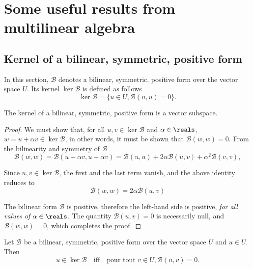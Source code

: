 \appendix

\section{Some useful results from multilinear algebra}

\subsection{Kernel of a bilinear, symmetric, positive form}

In this section, $\mathcal{B}$ denotes a bilinear, symmetric, positive form over the vector space $U$. Its kernel
$\ker \mathcal{B}$ is defined as follows
\begin{equation}
 \ker \mathcal{B}= \bigl\{ u \in U, \mathcal{B}(u, u) = 0 \bigr\} .
\end{equation}

\begin{theorem}
  The kernel of a bilinear, symmetric, positive form is a vector subspace.
\end{theorem}
\begin{proof}
  We must show that, for all $u, v \in\ker \mathcal{B}$ and $\alpha \in \reals$,
  $w = u + \alpha v \in \ker \mathcal{B}$, in other words, it must be shown that $\mathcal{B}(w, w) = 0$. From the
  bilinearity and symmetry of $\mathcal{B}$
 \begin{equation*}
   \mathcal{B}(w, w) = \mathcal{B}(u + \alpha v, u + \alpha v)
   = \mathcal{B}(u, u) + 2 \alpha \mathcal{B}(u, v) + \alpha^2 \mathcal{B}(v, v),
 \end{equation*}

 Since $u, v \in \ker\mathcal{B}$, the first and the last term vanish, and the above identity reduces to
 \begin{equation*}
   \mathcal{B}(w, w) = 2\alpha \mathcal{B}(u, v)
 \end{equation*}

 The bilinear form $\mathcal{B}$ is positive, therefore the left-hand side is positive, \emph{for all values of
   $\alpha \in \reals$}. The quantity $\mathcal{B}(u, v) = 0$ is necessarily null, and $\mathcal{B}(w, w) = 0$, which
 completes the proof.
\end{proof}

\begin{theorem}
  Let $\mathcal{B}$ be a bilinear, symmetric, positive form over the vector space $U$ and $u \in U$. Then
 \begin{equation*}
  u \in \ker\mathcal{B} \quad \text{iff} \quad \text{pour tout } v \in U, \mathcal{B}(u, v) = 0.
 \end{equation*}
\end{theorem}

